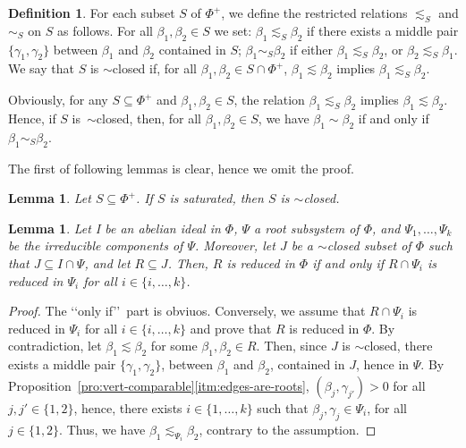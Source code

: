 \documentclass[10pt]{amsart}
\newtheorem{lem}[thm]{Lemma}
\theoremstyle{definition}
\newtheorem{defi}[thm]{Definition}
\theoremstyle{remark}
\newcommand\be{\beta}
\newcommand\ga{\gamma}
\begin{document}

\begin{defi} \label{def:restricted-sim}
For each subset  $S$ of $\Phi^+$, we define the restricted relations $\lesssim_S$ and $\sim_S$ on $S$ as follows.
For all $\be_1, \be_2\in S$ we set:  $\be_1 \lesssim_S \be_2$ if there exists a middle pair $\{\ga_1, \ga_2\}$ between $\be_1$ and $\be_2$ contained in $S$; 
 $\be_1 \sim_S \be_2$  if either $\be_1 \lesssim_S \be_2$, or $\be_2 \lesssim_S \be_1$.
We say that $S$ is  $\sim$closed if, for all $\be_1, \be_2\in S\cap \Phi^+$,   $\be_1 \lesssim\be_2$ implies   $\be_1 \lesssim_S  \be_2$. 
\end{defi}

Obviously, for any $S\subseteq \Phi^+$ and $\be_1, \be_2\in S$, the relation $\be_1 \lesssim_S \be_2$ implies $\be_1 \lesssim \be_2$.
Hence, if $S$ is~$\sim$closed, then, for all  $\be_1, \be_2\in S$, we have $\be_1\sim\be_2$ if and only if $\be_1\sim_S\be_2$.

The first of following lemmas is clear, hence we omit the proof.

\begin{lem}\label{lem:saturated-are-simclosed}
Let $S\subseteq \Phi^+$. 
If $S$ is saturated, then $S$ is $\sim$closed.
\end{lem}

\begin{lem}\label{lem:reduced-component-wise}
Let I be an abelian ideal in $\Phi$, $\Psi$ a root subsystem of $\Phi$, and $\Psi_1, \dots, \Psi_k$ be the irreducible components of $\Psi$. 
Moreover, let $J$ be a $\sim$closed subset of $\Phi$ such that $J\subseteq I\cap \Psi$, and  let $R\subseteq J$.
Then, $R$ is reduced in $\Phi$ if and only if $R\cap \Psi_i$ is reduced in $\Psi_i$ for all $i\in \{i, \dots, k\}$.
\end{lem}

\begin{proof}
The \lq\lq only if\rq\rq\ part is obviuos. 
Conversely, we assume that $R\cap \Psi_i$ is reduced in $\Psi_i$ for all $i\in \{i, \dots, k\}$ and prove that $R$ is reduced in $\Phi$.
By contradiction, let $\be_1\lesssim \be_2$ for some $\be_1, \be_2\in R$. 
Then, since $J$ is $\sim$closed, there exists a middle pair $\{\ga_1, \ga_2\}$, between $\be_1$ and $\be_2$, contained in $J$, hence in $\Psi$. 
By Proposition~\ref{pro:vert-comparable}\ref{itm:edges-are-roots}, $(\be_j,\ga_{j'})>0$  for all $j,j'\in \{1, 2\}$, hence,  there exists $i\in \{1, \dots, k\}$ such that $\be_j,\ga_j\in \Psi_i$, for all $j\in \{1, 2\}$. 
Thus, we have $\be_1\lesssim_{\Psi_i}\be_2$, contrary to the assumption.
\end{proof}
\end{document}
